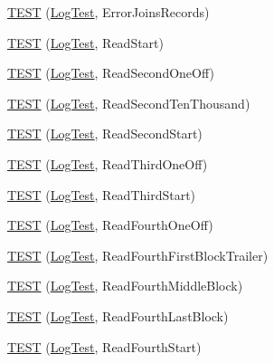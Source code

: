 \begin{DoxyCompactItemize}
\item 
\mbox{\hyperlink{namespaceleveldb_1_1log_a2ea9cc0af9f5d8b6bdc74e3126bd389a}{T\+E\+ST}} (\mbox{\hyperlink{classleveldb_1_1log_1_1_log_test}{Log\+Test}}, Error\+Joins\+Records)
\item 
\mbox{\hyperlink{namespaceleveldb_1_1log_a6ee7068a33cb134e26e7d1cf58327064}{T\+E\+ST}} (\mbox{\hyperlink{classleveldb_1_1log_1_1_log_test}{Log\+Test}}, Read\+Start)
\item 
\mbox{\hyperlink{namespaceleveldb_1_1log_af9cc8dffe50b0cefff163fdca58d1a08}{T\+E\+ST}} (\mbox{\hyperlink{classleveldb_1_1log_1_1_log_test}{Log\+Test}}, Read\+Second\+One\+Off)
\item 
\mbox{\hyperlink{namespaceleveldb_1_1log_ab734bca6b78216dc41b112075258dbe7}{T\+E\+ST}} (\mbox{\hyperlink{classleveldb_1_1log_1_1_log_test}{Log\+Test}}, Read\+Second\+Ten\+Thousand)
\item 
\mbox{\hyperlink{namespaceleveldb_1_1log_aa9e212a334431228c79a843316480db0}{T\+E\+ST}} (\mbox{\hyperlink{classleveldb_1_1log_1_1_log_test}{Log\+Test}}, Read\+Second\+Start)
\item 
\mbox{\hyperlink{namespaceleveldb_1_1log_af5f8505f08225382f290158f5175cca0}{T\+E\+ST}} (\mbox{\hyperlink{classleveldb_1_1log_1_1_log_test}{Log\+Test}}, Read\+Third\+One\+Off)
\item 
\mbox{\hyperlink{namespaceleveldb_1_1log_a87cfcd7bb0a248dc72d9856e1d00d519}{T\+E\+ST}} (\mbox{\hyperlink{classleveldb_1_1log_1_1_log_test}{Log\+Test}}, Read\+Third\+Start)
\item 
\mbox{\hyperlink{namespaceleveldb_1_1log_abbda151ff0e2439ac1dfa823a6089439}{T\+E\+ST}} (\mbox{\hyperlink{classleveldb_1_1log_1_1_log_test}{Log\+Test}}, Read\+Fourth\+One\+Off)
\item 
\mbox{\hyperlink{namespaceleveldb_1_1log_a85f6833939c09f181924774403bfbe4f}{T\+E\+ST}} (\mbox{\hyperlink{classleveldb_1_1log_1_1_log_test}{Log\+Test}}, Read\+Fourth\+First\+Block\+Trailer)
\item 
\mbox{\hyperlink{namespaceleveldb_1_1log_a6fb47c0abe5c036d95a4f9aeb1d62174}{T\+E\+ST}} (\mbox{\hyperlink{classleveldb_1_1log_1_1_log_test}{Log\+Test}}, Read\+Fourth\+Middle\+Block)
\item 
\mbox{\hyperlink{namespaceleveldb_1_1log_a9c80a844e21aec7c6fbde209e99c1ad8}{T\+E\+ST}} (\mbox{\hyperlink{classleveldb_1_1log_1_1_log_test}{Log\+Test}}, Read\+Fourth\+Last\+Block)
\item 
\mbox{\hyperlink{namespaceleveldb_1_1log_aa652940a4e7bff7fa21f0d1c941712d7}{T\+E\+ST}} (\mbox{\hyperlink{classleveldb_1_1log_1_1_log_test}{Log\+Test}}, Read\+Fourth\+Start)

\end{DoxyCompactItemize}
